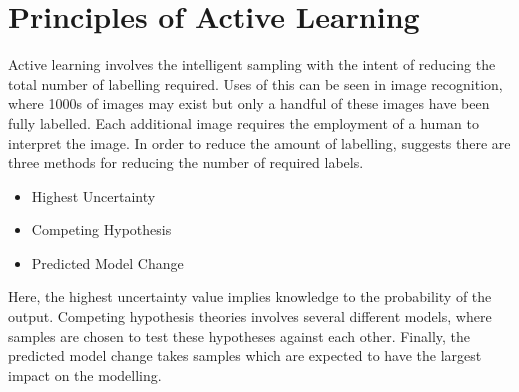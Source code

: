 \section{Principles of Active Learning}
Active learning involves the intelligent sampling with the intent of reducing the total number of labelling required. Uses of this can be seen in image recognition, where 1000s of images may exist but only a handful of these images have been fully labelled. Each additional image requires the employment of a human to interpret the image. In order to reduce the amount of labelling, \cite{activeLearning} suggests there are three methods for reducing the number of required labels.
\begin{itemize}
    \item Highest Uncertainty
    \item Competing Hypothesis
    \item Predicted Model Change
\end{itemize}
Here, the highest uncertainty value implies knowledge to the probability of the output. Competing hypothesis theories involves several different models, where samples are chosen to test these hypotheses against each other. Finally, the predicted model change takes samples which are expected to have the largest impact on the modelling.